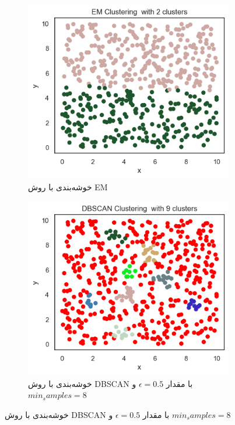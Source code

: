 \documentclass[a4paper, 12pt]{article}
\begin{document}
\begin{figure}[H]
		\medskip
		
		\begin{subfigure}[t]{.4\textwidth}
			\centering
			\includegraphics[width=\linewidth]{fig3.png}
			\caption{
			خوشه‌بندی با روش EM	
		}
		\end{subfigure}
		\hfill
		\begin{subfigure}[t]{.4\textwidth}
			\centering
			\includegraphics[width=\linewidth]{fig4.png}
			\caption{
			خوشه‌بندی با روش DBSCAN  با مقدار 
			$\epsilon = 0.5$
			و
			$min_samples = 8$	
		}
		\end{subfigure}
	\end{figure}
	
\end{document}

